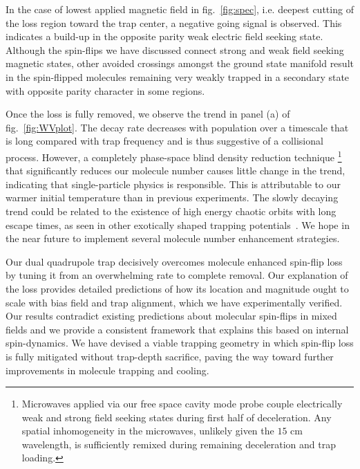 \documentclass[%
 reprint,
groupedaddress,
 amsmath,amssymb,
 aps,
prl,
]{revtex4-1}
\begin{document}

In the case of lowest applied magnetic field in fig.~\ref{fig:spec}, i.e. deepest cutting of the loss region toward the trap center, a negative going signal is observed. This indicates a build-up in the opposite parity weak electric field seeking state. Although the spin-flips we have discussed connect strong and weak field seeking magnetic states, other avoided crossings amongst the ground state manifold result in the spin-flipped molecules remaining very weakly trapped in a secondary state with opposite parity character in some regions. %

Once the loss is fully removed, we observe the trend in panel (a) of fig.~\ref{fig:WVplot}. The decay rate decreases with population over a timescale that is long compared with trap frequency and is thus suggestive of a collisional process. However, a completely phase-space blind density reduction technique \footnote{Microwaves applied via our free space cavity mode probe couple electrically weak and strong field seeking states during first half of deceleration. Any spatial inhomogeneity in the microwaves, unlikely given the $15\text{ cm}$ wavelength, is sufficiently remixed during remaining deceleration and trap loading.} that significantly reduces our molecule number causes little change in the trend, indicating that single-particle physics is responsible. This is attributable to our warmer initial temperature than in previous experiments. The slowly decaying trend could be related to the existence of high energy chaotic orbits with long escape times, as seen in other exotically shaped trapping potentials~\cite{Gonzalez-Ferez2014}. We hope in the near future to implement several molecule number enhancement strategies.

Our dual quadrupole trap decisively overcomes molecule enhanced spin-flip loss by tuning it from an overwhelming rate to complete removal. Our explanation of the loss provides detailed predictions of how its location and magnitude ought to scale with bias field and trap alignment, which we have experimentally verified. Our results contradict existing predictions about molecular spin-flips in mixed fields and we provide a consistent framework that explains this based on internal spin-dynamics. We have devised a viable trapping geometry in which spin-flip loss is fully mitigated without trap-depth sacrifice, paving the way toward further improvements in molecule trapping and cooling.
\end{document}
